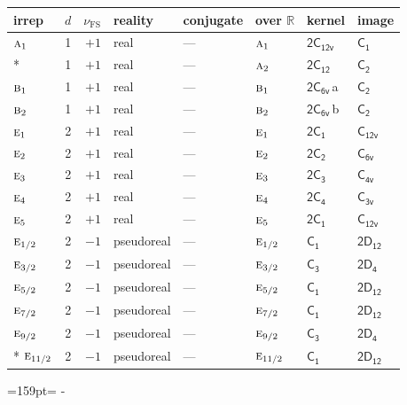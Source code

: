 \documentclass[10pt,a4paper]{article}
\makeatletter
\def\grouprule#1#2{\noalign{\marks\LTgroupmarks{\the\belowrulesep}\nobreak\vskip#1%
  \vskip\aboverulesep}\multispan\LT@cols\unskip{\leaders\hrule\@height#2\hfill\kern\z@}\cr
  \noalign{\penalty\LTrulebreak\vskip\belowrulesep\global\@lastruleclass\z@}}
\newcommand{\needspace}[1]{\par\penalty-100\begingroup\dimen0=#1\relax\dimen2=\pagegoal
  \advance\dimen2-\pagetotal\ifdim\dimen0>\dimen2\relax\ifdim\dimen2>0pt\vfil\break\fi\fi
  \endgroup}
\numberwithin{equation}{section}
\newcommand{\grp}[1]{\mathsf{#1}}
\newcommand{\irr}[1]{\text{\normalfont\scshape #1}}
\newcommand{\detbox}[1]{{\setlength{\fboxsep}{1pt}\fbox{#1}}}
\newcommand{\clsletter}[1]{\,{\scriptsize\color{black!55}#1}}
\newcommand{\fsind}{\nu_{\mathrm{FS}}}
\makeatother
\begin{document}
\setlength{\emergencystretch}{2em}\par\setlength{\emergencystretch}{0pt}
{\small\renewcommand{\arraystretch}{1.25}\setlength{\tabcolsep}{4pt}\begin{longtable}{@{}lrrlllll@{}}\toprule
irrep & $d$ & $\fsind$ & reality & conjugate & over $\mathbb{R}$ & kernel & image\\\midrule\endhead
\bottomrule\endfoot\endlastfoot
$\irr{a}_{1}$ & 1 & $+1$ & real & --- & $\irr{a}_{1}$ & \href{2C12v.pdf}{$\grp{2C_{12v}}$} & \href{../../../rotation/data/pdf/C1.pdf}{$\grp{C_{1}}$}\\*
\detbox{$\irr{a}_{2}$} & 1 & $+1$ & real & --- & $\irr{a}_{2}$ & \href{2C12.pdf}{$\grp{2C_{12}}$} & \href{../../../rotation/data/pdf/C2.pdf}{$\grp{C_{2}}$}\\
$\irr{b}_{1}$ & 1 & $+1$ & real & --- & $\irr{b}_{1}$ & \href{2C6v.pdf}{$\grp{2C_{6v}}$}\clsletter{a} & \href{../../../rotation/data/pdf/C2.pdf}{$\grp{C_{2}}$}\\
$\irr{b}_{2}$ & 1 & $+1$ & real & --- & $\irr{b}_{2}$ & \href{2C6v.pdf}{$\grp{2C_{6v}}$}\clsletter{b} & \href{../../../rotation/data/pdf/C2.pdf}{$\grp{C_{2}}$}\\
$\irr{e}_{1}$ & 2 & $+1$ & real & --- & $\irr{e}_{1}$ & \href{2C1.pdf}{$\grp{2C_{1}}$} & \href{../../../rotation/data/pdf/C12v.pdf}{$\grp{C_{12v}}$}\\
$\irr{e}_{2}$ & 2 & $+1$ & real & --- & $\irr{e}_{2}$ & \href{2C2.pdf}{$\grp{2C_{2}}$} & \href{../../../rotation/data/pdf/C6v.pdf}{$\grp{C_{6v}}$}\\
$\irr{e}_{3}$ & 2 & $+1$ & real & --- & $\irr{e}_{3}$ & \href{2C3.pdf}{$\grp{2C_{3}}$} & \href{../../../rotation/data/pdf/C4v.pdf}{$\grp{C_{4v}}$}\\
$\irr{e}_{4}$ & 2 & $+1$ & real & --- & $\irr{e}_{4}$ & \href{2C4.pdf}{$\grp{2C_{4}}$} & \href{../../../rotation/data/pdf/C3v.pdf}{$\grp{C_{3v}}$}\\
$\irr{e}_{5}$ & 2 & $+1$ & real & --- & $\irr{e}_{5}$ & \href{2C1.pdf}{$\grp{2C_{1}}$} & \href{../../../rotation/data/pdf/C12v.pdf}{$\grp{C_{12v}}$}\\
\grouprule{0pt}{\lightrulewidth}
$\irr{e}_{1/2}$ & 2 & $-1$ & pseudoreal & --- & $\irr{e}_{1/2}$ & \href{C1.pdf}{$\grp{C_{1}}$} & \href{2D12.pdf}{$\grp{2D_{12}}$}\\
$\irr{e}_{3/2}$ & 2 & $-1$ & pseudoreal & --- & $\irr{e}_{3/2}$ & \href{C3.pdf}{$\grp{C_{3}}$} & \href{2D4.pdf}{$\grp{2D_{4}}$}\\
$\irr{e}_{5/2}$ & 2 & $-1$ & pseudoreal & --- & $\irr{e}_{5/2}$ & \href{C1.pdf}{$\grp{C_{1}}$} & \href{2D12.pdf}{$\grp{2D_{12}}$}\\
$\irr{e}_{7/2}$ & 2 & $-1$ & pseudoreal & --- & $\irr{e}_{7/2}$ & \href{C1.pdf}{$\grp{C_{1}}$} & \href{2D12.pdf}{$\grp{2D_{12}}$}\\
$\irr{e}_{9/2}$ & 2 & $-1$ & pseudoreal & --- & $\irr{e}_{9/2}$ & \href{C3.pdf}{$\grp{C_{3}}$} & \href{2D4.pdf}{$\grp{2D_{4}}$}\\*
$\irr{e}_{11/2}$ & 2 & $-1$ & pseudoreal & --- & $\irr{e}_{11/2}$ & \href{C1.pdf}{$\grp{C_{1}}$} & \href{2D12.pdf}{$\grp{2D_{12}}$}\\
\bottomrule\end{longtable}}
\needspace{159pt}
\end{document}
